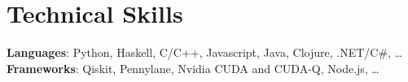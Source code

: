 \section{Technical Skills}\begin{itemize}[leftmargin=0.15in, label={}]
    \small{\item{
     \textbf{Languages}{: Python, Haskell, C/C++, Javascript, Java, Clojure, .NET/C\#, …} \\
     \textbf{Frameworks}{: Qiskit, Pennylane, Nvidia CUDA and CUDA-Q, Node.js, …} \\
    }}
 \end{itemize}